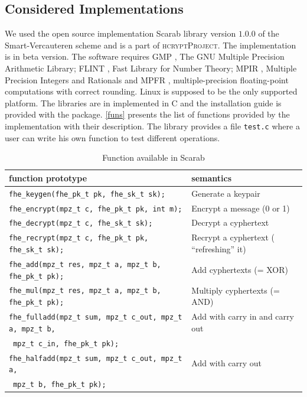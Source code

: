 \documentclass{acm_proc_article-sp}
\begin{document}
\subsection{Considered Implementations}
We used the open source implementation Scarab library \cite{hcrypt}  version $1.0.0$ of the Smart-Vercauteren scheme and is a part of \textsc{hcryptProject}. The implementation is in beta version. The software requires GMP \cite{gmp}, The GNU Multiple Precision Arithmetic Library; FLINT \cite{flint} , Fast Library for Number Theory; MPIR \cite{mpir}, Multiple Precision Integers and Rationals and MPFR \cite{mpfr}, multiple-precision floating-point computations with correct rounding. Linux is supposed to be the only supported platform. The libraries are in implemented in  C and the installation guide is provided with the package. \autoref{funs} presents the list of functions provided by the implementation with their description. The library provides a file \texttt{test.c} where a user can write his own function to test different operations.
\begin{table}
\caption{Function available in Scarab}
\begin{tabular}{|l|l||}
  \hline
  \textbf{function prototype} & \textbf{semantics}  \\
  \hline
 \texttt{fhe\_keygen(fhe\_pk\_t pk, fhe\_sk\_t sk);}  & 	Generate a keypair \\
\texttt{fhe\_encrypt(mpz\_t c, fhe\_pk\_t pk, int m);} &	Encrypt a message (0 or 1) \\
\texttt{fhe\_decrypt(mpz\_t c, fhe\_sk\_t sk);} &	Decrypt a cyphertext\\
\texttt{fhe\_recrypt(mpz\_t c, fhe\_pk\_t pk, fhe\_sk\_t sk); }	&Recrypt a cyphertext ( ``refreshing'' it) \\
\texttt{fhe\_add(mpz\_t res, mpz\_t a, mpz\_t b, fhe\_pk\_t pk);} &	Add cyphertexts (= XOR) \\
\texttt{fhe\_mul(mpz\_t res, mpz\_t a, mpz\_t b, fhe\_pk\_t pk);} &	Multiply cyphertexts (= AND) \\
\texttt{fhe\_fulladd(mpz\_t sum, mpz\_t c\_out, mpz\_t a, mpz\_t b,} &	Add with carry in and carry out \\
\phantom{x}\hspace{12ex} \texttt{ mpz\_t c\_in, fhe\_pk\_t pk);} & \\
\texttt{fhe\_halfadd(mpz\_t sum, mpz\_t c\_out, mpz\_t a,} &	Add with carry out \\
\phantom{x}\hspace{12ex} \texttt{ mpz\_t b, fhe\_pk\_t pk);} & \\  
\hline
\end{tabular}
\label{funs}
\end{table}
\end{document}
